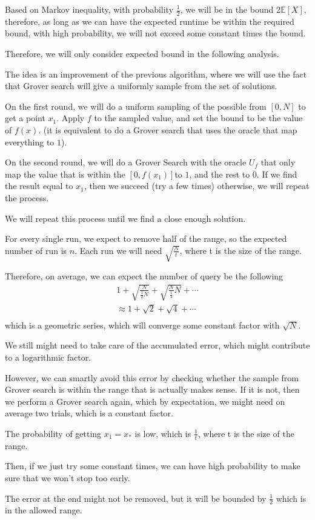 \documentclass{article}
\theoremstyle{definition}
\begin{document}
Based on Markov inequality, with probability \(\frac{1}{2}\), we will be in the bound
\(2\mathbb{E} [X]\), therefore, as long as we can have the expected runtime be within
the required bound, with high probability, we will not exceed some constant times the bound.

Therefore, we will only consider expected bound in the following analysis.

The idea is an improvement of the previous algorithm, where we will use the fact that
Grover search will give a uniformly sample from the set of solutions.

On the first round, we will do a uniform sampling of the possible from \([0, N]\) to get a point \(x_1\).
Apply \(f\) to the sampled value, and set the bound to be the value of \(f(x)\).
(it is equivalent to do a Grover search that uses the oracle that map everything to \(1\)).

On the second round, we will do a Grover Search with the oracle \(U_f\) that only
map the value that is within the \([0, f(x_1)]\)to \(1\), and the rest to \(0\).
If we find the result equal to \(x_1\), then we succeed (try a few times)
otherwise, we will repeat the process.

We will repeat this process until we find a close enough solution.

For every single run, we expect to remove half of the range, so the expected number of run is \(n\).
Each run we will need \(\sqrt{\frac{N}{t}}\), where t is the size of the range.

Therefore, on average, we can expect the number of query be the following
\[
  \begin{split}
    1 + \sqrt{\frac{N}{\frac{1}{2}N}} + \sqrt{\frac{N}{\frac{1}{4}}N} + \cdots \\
    \approx 1 + \sqrt{2} + \sqrt{4} + \cdots \\
  \end{split}
\]
which is a geometric series, which will converge some constant factor with \(\sqrt{N}\).

We still might need to take care of the accumulated error, which might contribute to a logarithmic factor.

However, we can smartly avoid this error by checking whether the sample from Grover
search is within the range that is actually makes sense. If it is not, then we perform
a Grover search again, which by expectation, we might need on average two trials, which is a constant factor.

The probability of getting \(x_1 = x_*\) is low, which is \(\frac{1}{t}\), where t is the size of the range.

Then, if we just try some constant times, we can have high probability to make sure that we won't stop too early.

The error at the end might not be removed, but it will be bounded by \(\frac{1}{2}\) which is in the allowed range.
\end{document}
